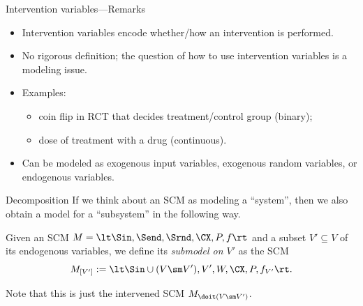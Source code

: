 \begin{frame}{Intervention variables---Remarks}
  \begin{itemize}
     \item Intervention variables encode whether/how an intervention is performed.
     \item No rigorous definition; the question of how to use intervention variables is a modeling issue.
     \item Examples: 
       \begin{itemize}
         \item coin flip in RCT that decides treatment/control group (binary);
         \item dose of treatment with a drug (continuous).
       \end{itemize}
     \item Can be modeled as exogenous input variables, exogenous random variables, or endogenous variables.
  \end{itemize}       
\end{frame}

\begin{frame}{Decomposition}
  If we think about an SCM as modeling a ``system'', then we also obtain a model for a ``subsystem'' in the following way.

  \begin{Def}[\ref{def:sub_scm}]
  Given an SCM $M = \lt \Sin, \Send, \Srnd, \CX, P, f \rt$ and a subset $V' \subseteq V$ of its endogenous variables, we define its \emph{submodel on $V'$} as the SCM
    $$M_{[V']} := \lt \Sin \cup (V \sm V'), V', W,\CX,P,f_{V'} \rt.$$
  \end{Def}
  Note that this is just the intervened SCM $M_{\doit(V \sm V')}$.
\end{frame}

